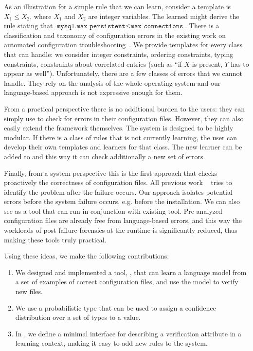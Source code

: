 As an 
illustration for a simple rule that we can learn, consider a template is $X_1 \le X_2$, where $X_1$ and $X_2$ are
integer variables. The learned might derive the rule stating that
$\texttt{mysql.max\_persistent} \le \texttt{max\_connections}$. There is a classification and taxonomy of configuration errors in the 
existing work on automated configuration troubleshooting~\cite{yin11anempirical, configdataset}. We provide templates for every class that \app can handle: we consider integer constraints, ordering
constraints, typing constraints, constraints about correlated entries (such as ``if $X$ is present, $Y$ has to appear as well''). Unfortunately, there are a few classes of errors that we cannot handle. They
 rely on the analysis of the whole operating system and our language-based
approach is not expressive enough for them. 

From a  practical perspective there is no additional burden 
to the users: they can simply use \app to check for errors in their configuration files. However, they can also easily extend the framework themselves. The system is designed to be highly modular. If there is a class of rules that \app is not currently learning, the user can develop their own templates and learners for that class. The new learner can be added to \app and this way it can check additionally a new set of errors.

Finally, from a system perspective this is the first approach that checks 
proactively the correctness of configuration files. All previous work
~\cite{xu15systems,zhang14encore,yuan11context, wang04automatic,attariyan10automating,
su07autobash,whitaker04configuration} tries to identify the problem after the
failure occurs. Our approach isolates potential errors before the system failure occurs, e.g. before the installation. We can also see \app as a tool that can run in conjunction with existing tool. Pre-analyzed configuration files are already free from language-based errors, and this way the workloads of post-failure forensics at the runtime
is significantly reduced, thus making these tools truly practical.

Using these ideas, we make the following contributions:

\begin{enumerate}

  \item We designed and implemented a tool, \app, that can learn a language model from a set of examples of correct configuration files, and use the model to verify new files.
  \item We use a probabilistic type that can be used to assign a confidence distribution over a set of types to a value.
  \item In \app, we define a minimal interface for describing a verification attribute in a learning context, making it easy to add new rules to the system.

\end{enumerate}
